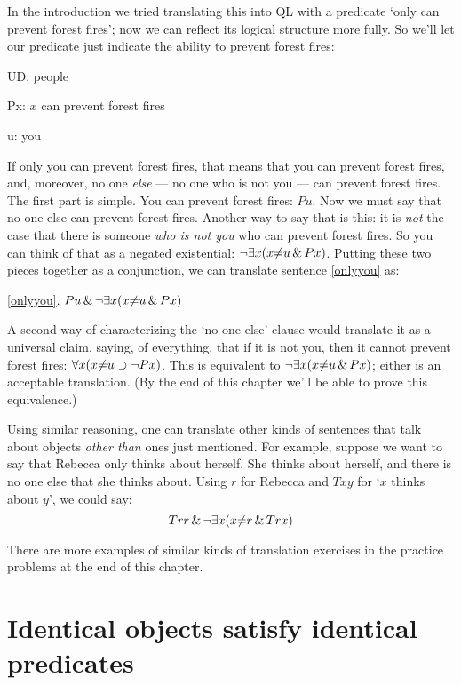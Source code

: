 In the introduction we tried translating this into QL with a predicate `only  \blank can prevent forest fires'; now we can reflect its logical structure more fully. So we'll let our predicate just indicate the ability to prevent forest fires:

\begin{ekey}
\item[UD:] people
\item[Px:] $x$ can prevent forest fires
\item[u:] you
\end{ekey}

If only you can prevent forest fires, that means that you can prevent forest fires, and, moreover, no one \emph{else} --- no one who is not you --- can prevent forest fires. The first part is simple. You can prevent forest fires: $Pu$. Now we must say that no one else can prevent forest fires. Another way to say that is this: it is \emph{not} the case that there is someone \emph{who is not you} who can prevent forest fires. So you can think of that as a negated existential: $\neg \exists x (x {\neq} u \,\&\, Px)$. Putting these two pieces together as a conjunction, we can translate sentence \ref{onlyyou} as:

\begin{earg}
\item[\ref{onlyyou}.] $Pu \,\&\, \neg \exists x (x {\neq} u \,\&\, Px)$
\end{earg}

A second way of characterizing the `no one else' clause would translate it as a universal claim, saying, of everything, that if it is not you, then it cannot prevent forest fires: $\forall x (x {\neq} u \supset \neg Px)$. This is equivalent to $\neg \exists x (x {\neq} u \,\&\, Px)$; either is an acceptable translation. (By the end of this chapter we'll be able to prove this equivalence.)

Using similar reasoning, one can translate other kinds of sentences that talk about objects \emph{other than} ones just mentioned. For example, suppose we want to say that Rebecca only thinks about herself. She thinks about herself, and there is no one else that she thinks about. Using $r$ for Rebecca and $Txy$ for `$x$ thinks about $y$', we could say: $$Trr \,\&\, \neg \exists x (x {\neq} r \,\&\, Trx)$$

There are more examples of similar kinds of translation exercises in the practice problems at the end of this chapter.

\section{Identical objects satisfy identical predicates}

